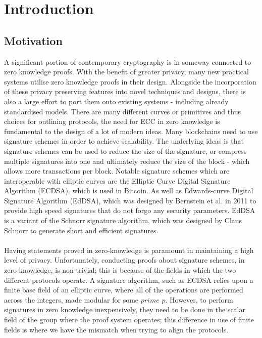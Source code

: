 \documentclass{article}
\theoremstyle{definition}
\theoremstyle{remark}
\begin{document}
	\newpage
	
	\tableofcontents
	
	\newpage
	
	\section{Introduction}
	
	\subsection{Motivation}
	
	A significant portion of contemporary cryptography is in someway connected to zero knowledge proofs. With the benefit of greater privacy, many new practical systems utilise zero knowledge proofs in their design. Alongside the incorporation of these privacy preserving features into novel techniques and designs, there is also a large effort to port them onto existing systems - including already standardised models. There are many different curves or primitives and thus choices for outlining protocols, the need for ECC in zero knowledge is fundamental to the design of a lot of modern ideas. Many blockchains need to use signature schemes in order to achieve scalability. The underlying ideas is that signature schemes can be used to reduce the size of the signature, or compress multiple signatures into one and ultimately reduce the size of the block - which allows more transactions per block. Notable signature schemes which are interoperable with elliptic curves are the Elliptic Curve Digital Signature Algorithm (ECDSA), which is used in Bitcoin. As well as Edwards-curve Digital Signature Algorithm (EdDSA), which was designed by Bernstein et al. in 2011 to provide high speed signatures that do not forgo any security parameters. EdDSA is a variant of the Schnorr signature algorithm, which was designed by Claus Schnorr to generate short and efficient signatures.\\\\ 
	
	Having statements proved in zero-knowledge is paramount in maintaining a high level of privacy. Unfortunately, conducting proofs about signature schemes, in zero knowledge, is non-trivial; this is because of the fields in which the two different protocols operate. A signature algorithm, such as ECDSA relies upon a finite base field of an elliptic curve, where all of the operations are performed across the integers, made modular for some $prime$ $p$. However, to perform signatures in zero knowledge inexpensively, they need to be done in the scalar field of the group where the proof system operates; this difference in use of finite fields is where we have the mismatch when trying to align the protocols. \\\\ 
	
\end{document}

